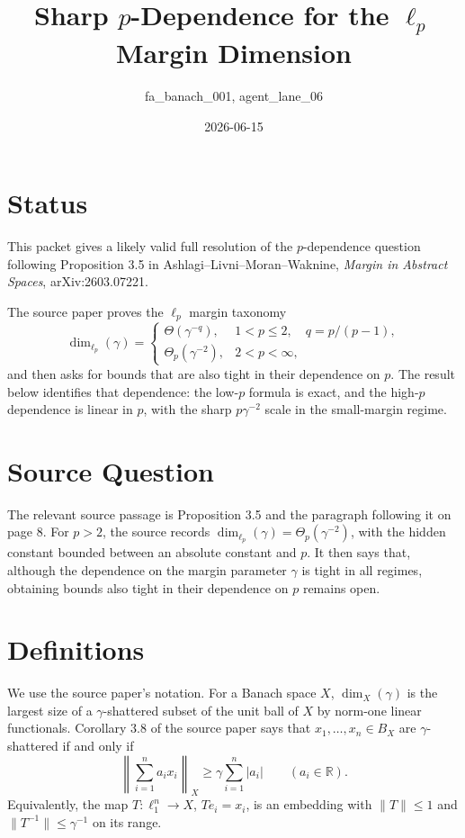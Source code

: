 \documentclass[11pt]{article}
\title{Sharp \(p\)-Dependence for the \(\ell_p\) Margin Dimension}
\author{fa\_banach\_001, agent\_lane\_06}
\date{2026-06-15}
\newcommand{\R}{\mathbb{R}}
\begin{document}
\maketitle

\section*{Status}

This packet gives a likely valid full resolution of the \(p\)-dependence
question following Proposition 3.5 in Ashlagi--Livni--Moran--Waknine,
\emph{Margin in Abstract Spaces}, arXiv:2603.07221.

The source paper proves the \(\ell_p\) margin taxonomy
\[
 \dim_{\ell_p}(\gamma)=
 \begin{cases}
   \Theta(\gamma^{-q}), & 1<p\le 2,\quad q=p/(p-1),\\
   \Theta_p(\gamma^{-2}), & 2<p<\infty,
 \end{cases}
\]
and then asks for bounds that are also tight in their dependence on \(p\).
The result below identifies that dependence: the low-\(p\) formula is exact,
and the high-\(p\) dependence is linear in \(p\), with the sharp
\(p\gamma^{-2}\) scale in the small-margin regime.

\section*{Source Question}

The relevant source passage is Proposition 3.5 and the paragraph following it
on page 8.  For \(p>2\), the source records
\(\dim_{\ell_p}(\gamma)=\Theta_p(\gamma^{-2})\), with the hidden constant
bounded between an absolute constant and \(p\).  It then says that, although
the dependence on the margin parameter \(\gamma\) is tight in all regimes,
obtaining bounds also tight in their dependence on \(p\) remains open.

\section*{Definitions}

We use the source paper's notation.  For a Banach space \(X\),
\(\dim_X(\gamma)\) is the largest size of a \(\gamma\)-shattered subset of the
unit ball of \(X\) by norm-one linear functionals.  Corollary 3.8 of the
source paper says that \(x_1,\ldots,x_n\in B_X\) are \(\gamma\)-shattered if
and only if
\[
  \left\|\sum_{i=1}^n a_i x_i\right\|_X
  \ge \gamma\sum_{i=1}^n |a_i|
  \qquad (a_i\in\R).
\]
Equivalently, the map \(T:\ell_1^n\to X\), \(Te_i=x_i\), is an embedding with
\(\|T\|\le 1\) and \(\|T^{-1}\|\le \gamma^{-1}\) on its range.
\end{document}
